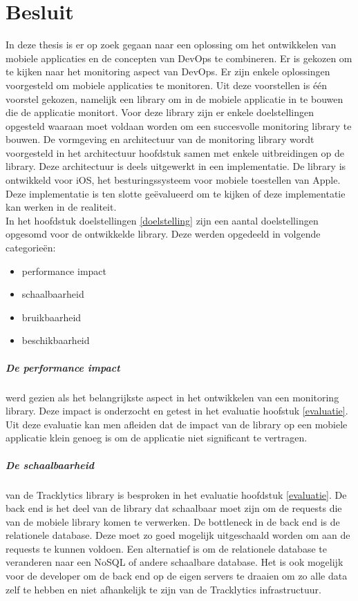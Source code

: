 \chapter{Besluit}
\label{besluit}


In deze thesis is er op zoek gegaan naar een oplossing om het ontwikkelen van mobiele applicaties en de concepten van DevOps te combineren. Er is gekozen om te kijken naar het monitoring aspect van DevOps. Er zijn enkele oplossingen voorgesteld om mobiele applicaties te monitoren. Uit deze voorstellen is \'e\'en voorstel gekozen, namelijk een library om in de mobiele applicatie in te bouwen die de applicatie monitort. Voor deze library zijn er enkele doelstellingen opgesteld waaraan moet voldaan worden om een succesvolle monitoring library te bouwen. De vormgeving en architectuur van de monitoring library wordt voorgesteld in het architectuur hoofdstuk samen met enkele uitbreidingen op de library. Deze architectuur is deels uitgewerkt in een implementatie. De library is ontwikkeld voor iOS, het besturingssysteem voor mobiele toestellen van Apple. Deze implementatie is ten slotte ge\"evalueerd om te kijken of deze implementatie kan werken in de realiteit. \\


In het hoofdstuk doelstellingen \ref{doelstelling} zijn een aantal doelstellingen opgesomd voor de ontwikkelde library. Deze werden opgedeeld in volgende categorie\"en: 
\begin{itemize}
\item performance impact
\item schaalbaarheid
\item bruikbaarheid
\item beschikbaarheid
\end{itemize}

\paragraph{De performance impact} werd gezien als het belangrijkste aspect in het ontwikkelen van een monitoring library. Deze impact is onderzocht en getest in het evaluatie hoofstuk \ref{evaluatie}. Uit deze evaluatie kan men afleiden dat de impact van de library op een mobiele applicatie klein genoeg is om de applicatie niet significant te vertragen. \\


\paragraph{De schaalbaarheid} van de Tracklytics library is besproken in het evaluatie hoofdstuk \ref{evaluatie}. De back end is het deel van de library dat schaalbaar moet zijn om de requests die van de mobiele library komen te verwerken. De bottleneck in de back end is de relationele database. Deze moet zo goed mogelijk uitgeschaald worden om aan de requests te kunnen voldoen. Een alternatief is om de relationele database te veranderen naar een NoSQL of andere schaalbare database. Het is ook mogelijk voor de developer om de back end op de eigen servers te draaien om zo alle data zelf te hebben en niet afhankelijk te zijn van de Tracklytics infrastructuur.\\


